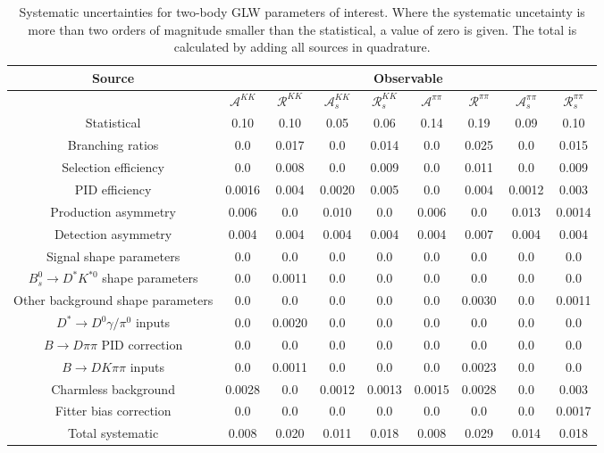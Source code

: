 \begin{sidewaystable}
  \centering
  \begin{tabular}{ccccccccc}
      \toprule
      Source & \multicolumn{8}{c}{Observable} \\
      \midrule
       & $\mathcal{A}^{KK}$ & $\mathcal{R}^{KK}$ & $\mathcal{A}_s^{KK}$ & $\mathcal{R}_{s}^{KK}$ & $\mathcal{A}^{\pi\pi}$ & $\mathcal{R}^{\pi\pi}$ & $\mathcal{A}_s^{\pi\pi}$ & $\mathcal{R}_{s}^{\pi\pi}$ \\
      \midrule
      Statistical & 0.10 & 0.10 & 0.05 & 0.06 & 0.14 & 0.19 & 0.09 & 0.10 \\
      \midrule
      Branching ratios & 0.0  & 0.017 & 0.0  & 0.014 & 0.0  & 0.025 & 0.0  & 0.015 \\
      Selection efficiency & 0.0  & 0.008 & 0.0  & 0.009 & 0.0  & 0.011 & 0.0  & 0.009 \\
      PID efficiency & 0.0016 & 0.004 & 0.0020 & 0.005 & 0.0  & 0.004 & 0.0012 & 0.003 \\
      Production asymmetry & 0.006 & 0.0  & 0.010 & 0.0  & 0.006 & 0.0  & 0.013 & 0.0014 \\
      Detection asymmetry & 0.004 & 0.004 & 0.004 & 0.004 & 0.004 & 0.007 & 0.004 & 0.004 \\
      Signal shape parameters & 0.0  & 0.0  & 0.0  & 0.0  & 0.0  & 0.0  & 0.0  & 0.0  \\
      $B^0_s \to D^* K^{*0}$ shape parameters & 0.0  & 0.0011 & 0.0  & 0.0  & 0.0  & 0.0  & 0.0  & 0.0  \\
      Other background shape parameters & 0.0  & 0.0  & 0.0  & 0.0  & 0.0  & 0.0030 & 0.0  & 0.0011 \\
      $D^* \to D^0 \gamma/\pi^0$ inputs & 0.0  & 0.0020 & 0.0  & 0.0  & 0.0  & 0.0  & 0.0  & 0.0  \\
      $B\to D\pi\pi$ PID correction & 0.0  & 0.0  & 0.0  & 0.0  & 0.0  & 0.0  & 0.0  & 0.0  \\
      $B\to DK\pi\pi$ inputs & 0.0  & 0.0011 & 0.0  & 0.0  & 0.0  & 0.0023 & 0.0  & 0.0  \\
      Charmless background & 0.0028 & 0.0  & 0.0012 & 0.0013 & 0.0015 & 0.0028 & 0.0  & 0.003 \\
      Fitter bias correction & 0.0  & 0.0  & 0.0  & 0.0  & 0.0  & 0.0  & 0.0  & 0.0017 \\
      \midrule
      Total systematic & 0.008 & 0.020 & 0.011 & 0.018 & 0.008 & 0.029 & 0.014 & 0.018 \\
      \bottomrule
  \end{tabular}
  \caption{Systematic uncertainties for two-body GLW parameters of interest. Where the systematic uncetainty is more than two orders of magnitude smaller than the statistical, a value of zero is given. The total is calculated by adding all sources in quadrature.}
\label{tab:twoBody_GLW_systematics}
\end{sidewaystable}
